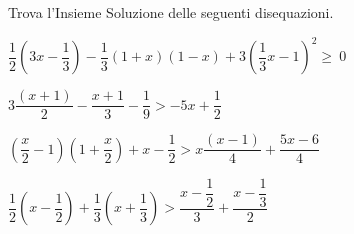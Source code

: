 \begin{esercizio}[\Ast]
 \label{ese:21.15}
Trova l'Insieme Soluzione delle seguenti disequazioni.
 \begin{enumeratea}
 \item \(\dfrac{1}{2}\left(3x-\dfrac{1}{3}\right)-\dfrac{1}{3}(1+x)(1-x)+3\left(\dfrac{1}{3}x-1\right)^{2}\ge~0\)
\item \(3\dfrac{(x+1)}{2}-\dfrac{x+1}{3}-\dfrac{1}{9}>-5x+\dfrac{1}{2}\)
\item \(\left(\dfrac{x}{2}-1\right)\left(1+\dfrac{x}{2}\right)+x-\dfrac{1}{2}>x\dfrac{(x-1)}{4}+\dfrac{5x-6}{4}\)
\item \(\dfrac{1}{2}\left(x-\dfrac{1}{2}\right)+\dfrac{1}{3}\left(x+\dfrac{1}{3}\right)>\dfrac{x-\dfrac{1}{2}}{3}+\dfrac{x-\dfrac{1}{3}}{2}\)
\end{enumeratea}
\end{esercizio}
